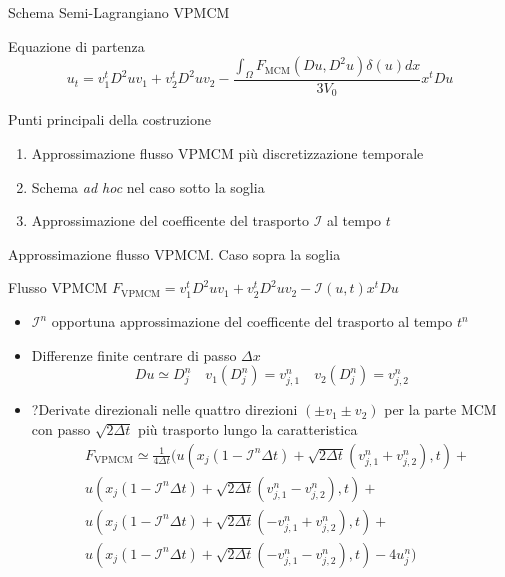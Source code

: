 \begin{frame}{Schema Semi-Lagrangiano VPMCM}
  \begin{block}{Equazione di partenza}
    \[
    u_t=v_1^tD^2uv_1+v_2^tD^2uv_2 - \frac{\int_{\Omega}F_{\text{MCM}}(Du,D^2u)\delta(u)dx}{3V_0}x^tDu
    \]
  \end{block}
  \begin{block}{Punti principali della costruzione}
    \begin{enumerate}
    \item Approssimazione flusso VPMCM più discretizzazione temporale
    \item Schema \emph{ad hoc} nel caso sotto la soglia
    \item Approssimazione del coefficente del trasporto $\mathcal{I}$
      al tempo $t$ 
    \end{enumerate}
  \end{block}
\end{frame}
 
\begin{frame}{Approssimazione flusso VPMCM. Caso sopra la soglia}
  \begin{alertblock}{Flusso VPMCM}
    $F_{\text{VPMCM}}=v_1^tD^2uv_1+v_2^tD^2uv_2 -
    \mathcal{I}(u,t)x^tDu$
    \end{alertblock}
  \begin{itemize}
    \item $\mathcal{I}^n$ opportuna approssimazione del coefficente
      del trasporto al  tempo $t^n$
    \item Differenze finite centrare di passo $\Delta x$ 
      \[
      Du\simeq D_j^n\quad v_1(D_j^n)=v_{j,1}^n\quad v_2(D_j^n)=v_{j,2}^n
      \]
    \item ?Derivate direzionali nelle \alert{quattro} direzioni $(\pm
      v_1\pm v_2)$ per la parte MCM con passo $\sqrt{2\Delta t}$ più
      trasporto lungo la caratteristica
      \[
      \begin{aligned}
        &F_{\text{VPMCM}}\simeq\frac{1}{4\Delta
          t}(u(x_j(1-\mathcal{I}^n\Delta t)+\sqrt{2\Delta
          t}(v_{j,1}^n+v_{j,2}^n),t)+ \\
        &u(x_j(1-\mathcal{I}^n\Delta t)+\sqrt{2\Delta
          t}(v_{j,1}^n-v_{j,2}^n),t)+\\
        &u(x_j(1-\mathcal{I}^n\Delta t)+\sqrt{2\Delta
          t}(-v_{j,1}^n+v_{j,2}^n),t)+\\
        &u(x_j(1-\mathcal{I}^n\Delta t)+\sqrt{2\Delta
          t}(-v_{j,1}^n-v_{j,2}^n),t)-4u_j^n)
      \end{aligned}
      \]
  \end{itemize}
\end{frame}

